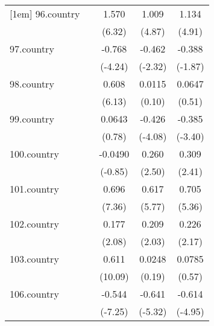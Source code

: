 {\begin{tabular}{l*{4}{c}}
[1em]
96.country  &                     &       1.570\sym{***}&       1.009\sym{***}&       1.134\sym{***}\\
            &                     &      (6.32)         &      (4.87)         &      (4.91)         \\
[1em]
97.country  &                     &      -0.768\sym{***}&      -0.462\sym{*}  &      -0.388         \\
            &                     &     (-4.24)         &     (-2.32)         &     (-1.87)         \\
[1em]
98.country  &                     &       0.608\sym{***}&      0.0115         &      0.0647         \\
            &                     &      (6.13)         &      (0.10)         &      (0.51)         \\
[1em]
99.country  &                     &      0.0643         &      -0.426\sym{***}&      -0.385\sym{***}\\
            &                     &      (0.78)         &     (-4.08)         &     (-3.40)         \\
[1em]
100.country &                     &     -0.0490         &       0.260\sym{*}  &       0.309\sym{*}  \\
            &                     &     (-0.85)         &      (2.50)         &      (2.41)         \\
[1em]
101.country &                     &       0.696\sym{***}&       0.617\sym{***}&       0.705\sym{***}\\
            &                     &      (7.36)         &      (5.77)         &      (5.36)         \\
[1em]
102.country &                     &       0.177\sym{*}  &       0.209\sym{*}  &       0.226\sym{*}  \\
            &                     &      (2.08)         &      (2.03)         &      (2.17)         \\
[1em]
103.country &                     &       0.611\sym{***}&      0.0248         &      0.0785         \\
            &                     &     (10.09)         &      (0.19)         &      (0.57)         \\
[1em]
106.country &                     &      -0.544\sym{***}&      -0.641\sym{***}&      -0.614\sym{***}\\
            &                     &     (-7.25)         &     (-5.32)         &     (-4.95)         \\

\end{tabular}}
